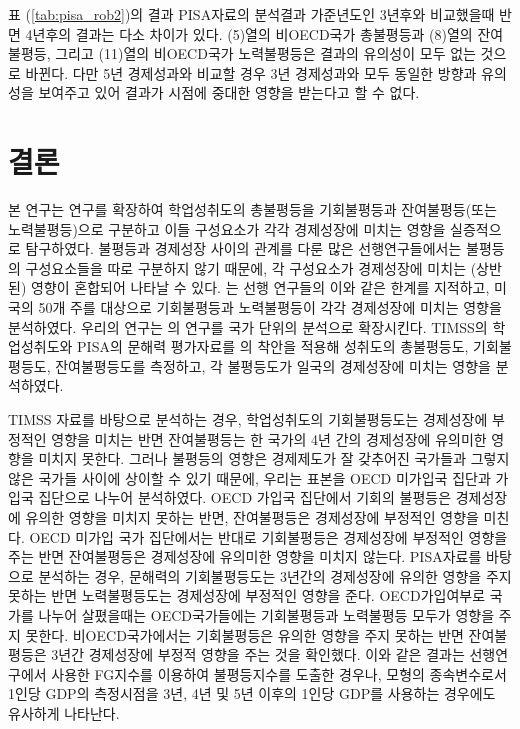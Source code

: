 

표 (\ref{tab:pisa_rob2})의 결과 PISA자료의 분석결과 가준년도인 3년후와 비교했을때 반면 4년후의 결과는 다소 차이가 있다. (5)열의 비OECD국가 총불평등과 (8)열의 잔여불평등, 그리고 (11)열의 비OECD국가 노력불평등은 결과의 유의성이 모두 없는 것으로 바뀐다. 다만 5년 경제성과와 비교할 경우 3년 경제성과와 모두 동일한 방향과 유의성을 보여주고 있어 결과가 시점에 중대한 영향을 받는다고 할 수 없다.



\section{결론}

본 연구는 \cite{kno17} 연구를 확장하여 학업성취도의 총불평등을 기회불평등과 잔여불평등(또는 노력불평등)으로 구분하고 이들 구성요소가 각각 경제성장에 미치는 영향을 실증적으로 탐구하였다. 불평등과 경제성장 사이의 관계를 다룬 많은 선행연구들에서는 불평등의 구성요소들을 따로 구분하지 않기 때문에, 각 구성요소가 경제성장에 미치는 (상반된) 영향이 혼합되어 나타날 수 있다. \cite{metl13}는 선행 연구들의 이와 같은 한계를 지적하고, 미국의 50개 주를 대상으로 기회불평등과 노력불평등이 각각 경제성장에 미치는 영향을 분석하였다. 우리의 연구는 \cite{metl13}의 연구를 국가 단위의 분석으로 확장시킨다. TIMSS의 학업성취도와 PISA의 문해력 평가자료를 \cite{betl12}의 착안을 적용해 성취도의 총불평등도, 기회불평등도, 잔여불평등도를 측정하고, 각 불평등도가 일국의 경제성장에 미치는 영향을 분석하였다.

TIMSS 자료를 바탕으로 분석하는 경우, 학업성취도의 기회불평등도는 경제성장에 부정적인 영향을 미치는 반면 잔여불평등는 한 국가의 4년 간의 경제성장에 유의미한 영향을 미치지 못한다.
그러나 불평등의 영향은 경제제도가 잘 갖추어진 국가들과 그렇지 않은 국가들 사이에 상이할 수 있기 때문에, 우리는 표본을 OECD 미가입국 집단과 가입국 집단으로 나누어 분석하였다.
OECD 가입국 집단에서 기회의 불평등은 경제성장에 유의한 영향을 미치지 못하는 반면, 잔여불평등은 경제성장에 부정적인 영향을 미친다.
OECD 미가입 국가 집단에서는 반대로 기회불평등은 경제성장에 부정적인 영향을 주는 반면 잔여불평등은 경제성장에 유의미한 영향을 미치지 않는다.
PISA자료를 바탕으로 분석하는 경우, 문해력의 기회불평등도는 3년간의 경제성장에 유의한 영향을 주지 못하는 반면 노력불평등도는 경제성장에 부정적인 영향을 준다.
OECD가입여부로 국가를 나누어 살폈을때는 OECD국가들에는 기회불평등과 노력불평등 모두가 영향을 주지 못한다.
비OECD국가에서는 기회불평등은 유의한 영향을 주지 못하는 반면 잔여불평등은 3년간 경제성장에 부정적 영향을 주는 것을 확인했다.
이와 같은 결과는 선행연구에서 사용한 FG지수를 이용하여 불평등지수를 도출한 경우나, 모형의 종속변수로서 1인당 GDP의 측정시점을 3년, 4년 및 5년 이후의 1인당 GDP를 사용하는 경우에도 유사하게 나타난다.
 
